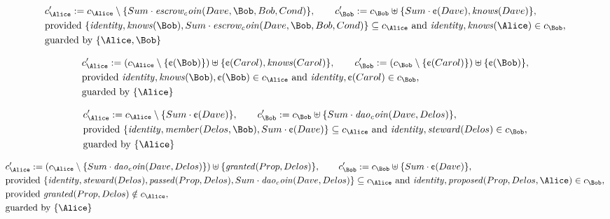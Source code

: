 \begin{align*}
&
c'_
{
\Alice
}
 := 
c_
{
\Alice
}
 \setminus 
\{
Sum
\cdot
\mathit{
escrow_coin
}
(
Dave
,
\Bob
,
Bob
,
Cond
)
\}
, \qquad 
c'_
{
\Bob
}
 := 
c_
{
\Bob
}
 \uplus 
\{
Sum
\cdot
\text{\textcent}
(
Dave
)
,
\mathit{
knows
}
(
Dave
)
\}
,\\
&
\text{provided } 
\{
\mathit{
identity
}
,
\mathit{
knows
}
(
\Bob
)
,
Sum
\cdot
\mathit{
escrow_coin
}
(
Dave
,
\Bob
,
Bob
,
Cond
)
\}
 \subseteq c_
{
\Alice
}
 \text{ and } 
\mathit{
identity
}
,
\mathit{
knows
}
(
\Alice
)
 \in c_
{
\Bob
}
,\\
&
\text{guarded by } \{
\Alice
,
\Bob
\}
\end{align*}

\begin{align*}
&
c'_
{
\Alice
}
 := 
(c_
{
\Alice
}
 \setminus 
\{
\text{\textcent}
(
\Bob
)
\}
) \uplus 
\{
\text{\textcent}
(
Carol
)
,
\mathit{
knows
}
(
Carol
)
\}
, \qquad 
c'_
{
\Bob
}
 := 
(c_
{
\Bob
}
 \setminus 
\{
\text{\textcent}
(
Carol
)
\}
) \uplus 
\{
\text{\textcent}
(
\Bob
)
\}
,\\
&
\text{provided } 
\mathit{
identity
}
,
\mathit{
knows
}
(
\Bob
)
,
\text{\textcent}
(
\Bob
)
 \in c_
{
\Alice
}
 \text{ and } 
\mathit{
identity
}
,
\text{\textcent}
(
Carol
)
 \in c_
{
\Bob
}
,\\
&
\text{guarded by } \{
\Alice
\}
\end{align*}

\begin{align*}
&
c'_
{
\Alice
}
 := 
c_
{
\Alice
}
 \setminus 
\{
Sum
\cdot
\text{\textcent}
(
Dave
)
\}
, \qquad 
c'_
{
\Bob
}
 := 
c_
{
\Bob
}
 \uplus 
\{
Sum
\cdot
\mathit{
dao_coin
}
(
Dave
,
Delos
)
\}
,\\
&
\text{provided } 
\{
\mathit{
identity
}
,
\mathit{
member
}
(
Delos
,
\Bob
)
,
Sum
\cdot
\text{\textcent}
(
Dave
)
\}
 \subseteq c_
{
\Alice
}
 \text{ and } 
\mathit{
identity
}
,
\mathit{
steward
}
(
Delos
)
 \in c_
{
\Bob
}
,\\
&
\text{guarded by } \{
\Alice
\}
\end{align*}

\begin{align*}
&
c'_
{
\Alice
}
 := 
(c_
{
\Alice
}
 \setminus 
\{
Sum
\cdot
\mathit{
dao_coin
}
(
Dave
,
Delos
)
\}
) \uplus 
\{
\mathit{
granted
}
(
Prop
,
Delos
)
\}
, \qquad 
c'_
{
\Bob
}
 := 
c_
{
\Bob
}
 \uplus 
\{
Sum
\cdot
\text{\textcent}
(
Dave
)
\}
,\\
&
\text{provided } 
\{
\mathit{
identity
}
,
\mathit{
steward
}
(
Delos
)
,
\mathit{
passed
}
(
Prop
,
Delos
)
,
Sum
\cdot
\mathit{
dao_coin
}
(
Dave
,
Delos
)
\}
 \subseteq c_
{
\Alice
}
 \text{ and } 
\mathit{
identity
}
,
\mathit{
proposed
}
(
Prop
,
Delos
,
\Alice
)
 \in c_
{
\Bob
}
,\\
&
\text{provided } 
\mathit{
granted
}
(
Prop
,
Delos
)
 \notin c_
{
\Alice
}
,\\
&
\text{guarded by } \{
\Alice
\}
\end{align*}

